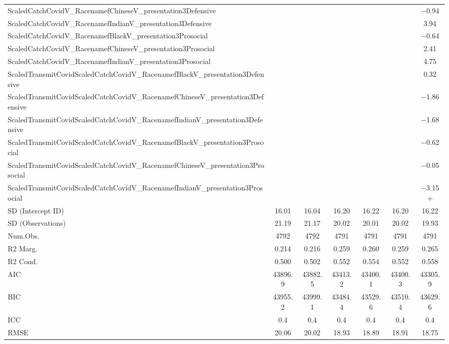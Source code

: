 \documentclass[]{report}
\begin{document}
\begin{table}
{\begin{tabular}[t]{lcccccc}
		ScaledCatchCovidV\_RacenamefChineseV\_presentation3Defensive &  &  &  &  &  & \num{-0.94}\\
		ScaledCatchCovidV\_RacenamefIndianV\_presentation3Defensive &  &  &  &  &  & \num{3.94}\\
		ScaledCatchCovidV\_RacenamefBlackV\_presentation3Prosocial &  &  &  &  &  & \num{-0.64}\\
		ScaledCatchCovidV\_RacenamefChineseV\_presentation3Prosocial &  &  &  &  &  & \num{2.41}\\
		ScaledCatchCovidV\_RacenamefIndianV\_presentation3Prosocial &  &  &  &  &  & \num{4.75}\\
		ScaledTransmitCovidScaledCatchCovidV\_RacenamefBlackV\_presentation3Defensive &  &  &  &  &  & \num{0.32}\\
		ScaledTransmitCovidScaledCatchCovidV\_RacenamefChineseV\_presentation3Defensive &  &  &  &  &  & \num{-1.86}\\
		ScaledTransmitCovidScaledCatchCovidV\_RacenamefIndianV\_presentation3Defensive &  &  &  &  &  & \num{-1.68}\\
		ScaledTransmitCovidScaledCatchCovidV\_RacenamefBlackV\_presentation3Prosocial &  &  &  &  &  & \num{-0.62}\\
		ScaledTransmitCovidScaledCatchCovidV\_RacenamefChineseV\_presentation3Prosocial &  &  &  &  &  & \num{-0.05}\\
		ScaledTransmitCovidScaledCatchCovidV\_RacenamefIndianV\_presentation3Prosocial &  &  &  &  &  & \num{-3.15}+\\
		SD (Intercept ID) & \num{16.01} & \num{16.04} & \num{16.20} & \num{16.22} & \num{16.20} & \num{16.22}\\
		SD (Observations) & \num{21.19} & \num{21.17} & \num{20.02} & \num{20.01} & \num{20.02} & \num{19.93}\\
		\midrule
		Num.Obs. & \num{4792} & \num{4792} & \num{4791} & \num{4791} & \num{4791} & \num{4791}\\
		R2 Marg. & \num{0.214} & \num{0.216} & \num{0.259} & \num{0.260} & \num{0.259} & \num{0.265}\\
		R2 Cond. & \num{0.500} & \num{0.502} & \num{0.552} & \num{0.554} & \num{0.552} & \num{0.558}\\
		AIC & \num{43896.9} & \num{43882.5} & \num{43413.2} & \num{43400.1} & \num{43400.3} & \num{43305.9}\\
		BIC & \num{43955.2} & \num{43999.1} & \num{43484.4} & \num{43529.6} & \num{43510.4} & \num{43629.6}\\
		ICC & \num{0.4} & \num{0.4} & \num{0.4} & \num{0.4} & \num{0.4} & \num{0.4}\\
		RMSE & \num{20.06} & \num{20.02} & \num{18.93} & \num{18.89} & \num{18.91} & \num{18.75}\\
		\bottomrule
	\end{tabular}}
\end{table}
\end{document}
